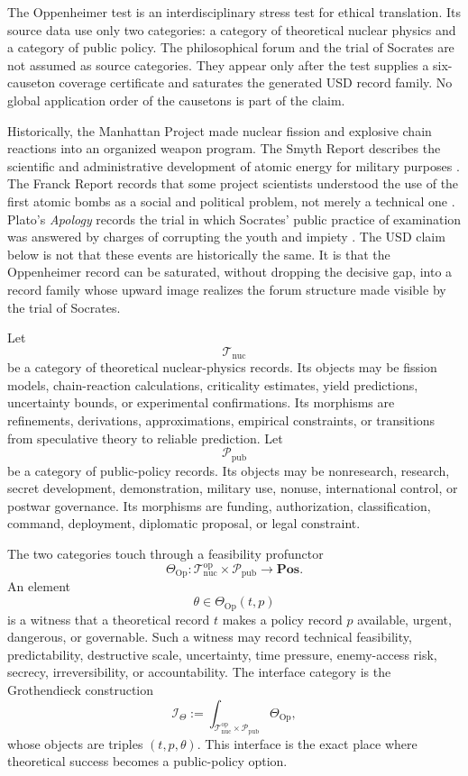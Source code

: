 \documentclass[11pt]{article}
\newcommand{\op}{\mathrm{op}}
\newcommand{\defeq}{\mathrel{:=}}
\newcommand{\Pos}{\mathbf{Pos}}
\theoremstyle{definition}
\theoremstyle{plain}
\begin{document}
The Oppenheimer test is an interdisciplinary stress test for ethical
translation.  Its source data use only two categories: a category of
theoretical nuclear physics and a category of public policy.  The
philosophical forum and the trial of Socrates are not assumed as source
categories.  They appear only after the test supplies a six-causeton
coverage certificate and saturates the generated USD record family.  No
global application order of the causetons is part of the claim.

Historically, the Manhattan Project made nuclear fission and explosive
chain reactions into an organized weapon program.  The Smyth Report
describes the scientific and administrative development of atomic energy
for military purposes \cite{Smyth1945}.  The Franck Report records that
some project scientists understood the use of the first atomic bombs as a
social and political problem, not merely a technical one
\cite{Franck1945}.  Plato's \emph{Apology} records the trial in which
Socrates' public practice of examination was answered by charges of
corrupting the youth and impiety \cite{PlatoApology}.  The USD claim
below is not that these events are historically the same.  It is that
the Oppenheimer record can be saturated, without dropping the decisive
gap, into a record family whose upward image realizes the forum structure
made visible by the trial of Socrates.

Let
\[
  \mathcal T_{\mathrm{nuc}}
\]
be a category of theoretical nuclear-physics records.  Its objects may be
fission models, chain-reaction calculations, criticality estimates,
yield predictions, uncertainty bounds, or experimental confirmations.
Its morphisms are refinements, derivations, approximations, empirical
constraints, or transitions from speculative theory to reliable
prediction.  Let
\[
  \mathcal P_{\mathrm{pub}}
\]
be a category of public-policy records.  Its objects may be nonresearch,
research, secret development, demonstration, military use, nonuse,
international control, or postwar governance.  Its morphisms are funding,
authorization, classification, command, deployment, diplomatic proposal,
or legal constraint.

The two categories touch through a feasibility profunctor
\[
  \Theta_{\mathrm{Op}}:
  \mathcal T_{\mathrm{nuc}}^{\op}\times
  \mathcal P_{\mathrm{pub}}
  \to \Pos.
\]
An element
\[
  \theta\in\Theta_{\mathrm{Op}}(t,p)
\]
is a witness that a theoretical record $t$ makes a policy record $p$
available, urgent, dangerous, or governable.  Such a witness may record
technical feasibility, predictability, destructive scale, uncertainty,
time pressure, enemy-access risk, secrecy, irreversibility, or
accountability.  The interface category is the Grothendieck construction
\[
  \mathcal I_{\Theta}
  \defeq
  \int_{\mathcal T_{\mathrm{nuc}}^{\op}\times
        \mathcal P_{\mathrm{pub}}}
  \Theta_{\mathrm{Op}},
\]
whose objects are triples $(t,p,\theta)$.  This interface is the exact
place where theoretical success becomes a public-policy option.
\end{document}
